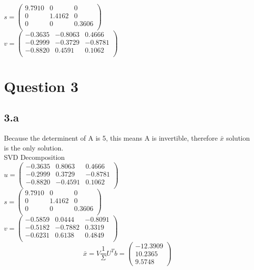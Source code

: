 \documentclass{article}
\begin{document}
$s =
\begin{pmatrix}
    9.7910   &      0    &     0\\
         0   & 1.4162    &     0\\
         0   &      0   & 0.3606\\

\end{pmatrix}$\\

$v =
\begin{pmatrix}
   -0.3635 &  -0.8063  &  0.4666\\
   -0.2999 &  -0.3729 &  -0.8781\\
   -0.8820  &  0.4591 &   0.1062\\
\end{pmatrix}$
\section{Question 3}
\subsection*{3.a}
Because the determinent of A is 5, this means A is invertible, therefore $\bar{x}$ solution is the only solution. \\
SVD Decomposition\\
$u =
\begin{pmatrix}
   -0.3635 &   0.8063 &   0.4666 \\
   -0.2999 &   0.3729 &  -0.8781\\
   -0.8820 &  -0.4591 &   0.1062\\
\end{pmatrix}$\\

$s =
\begin{pmatrix}
    9.7910   &      0      &   0\\
         0  &  1.4162      &   0\\
         0   &      0  &  0.3606\\
\end{pmatrix}$\\

$v =
\begin{pmatrix}
   -0.5859 &   0.0444  & -0.8091 \\
   -0.5182 &  -0.7882  &  0.3319 \\
   -0.6231 &   0.6138  &  0.4849 \\
\end{pmatrix}$
\begin{equation*}
\bar{x} = V\frac{1}{\Sigma}U^Tb = 
\begin{pmatrix}
-12.3909 \\
10.2365 \\
9.5748
\end{pmatrix}
\end{equation*}
\end{document}
